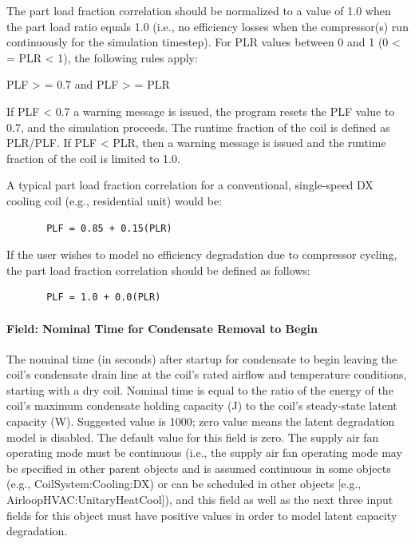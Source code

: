The part load fraction correlation should be normalized to a value of 1.0 when the part load ratio equals 1.0 (i.e., no efficiency losses when the compressor(s) run continuously for the simulation timestep). For PLR values between 0 and 1 (0 \textless{} = PLR \textless{} 1), the following rules apply:

PLF \textgreater{} = 0.7 and PLF \textgreater{} = PLR

If PLF \textless{} 0.7 a warning message is issued, the program resets the PLF value to 0.7, and the simulation proceeds. The runtime fraction of the coil is defined as PLR/PLF. If PLF \textless{} PLR, then a warning message is issued and the runtime fraction of the coil is limited to 1.0.

A typical part load fraction correlation for a conventional, single-speed DX cooling coil (e.g., residential unit) would be:

\begin{lstlisting}
       PLF = 0.85 + 0.15(PLR)
\end{lstlisting}

If the user wishes to model no efficiency degradation due to compressor cycling, the part load fraction correlation should be defined as follows:

\begin{lstlisting}
       PLF = 1.0 + 0.0(PLR)
\end{lstlisting}

\paragraph{Field: Nominal Time for Condensate Removal to Begin}\label{field-nominal-time-for-condensate-removal-to-begin}

The nominal time (in seconds) after startup for condensate to begin leaving the coil's condensate drain line at the coil's rated airflow and temperature conditions, starting with a dry coil. Nominal time is equal to the ratio of the energy of the coil's maximum condensate holding capacity (J) to the coil's steady-state latent capacity (W). Suggested value is 1000; zero value means the latent degradation model is disabled. The default value for this field is zero. The supply air fan operating mode must be continuous (i.e., the supply air fan operating mode may be specified in other parent objects and is assumed continuous in some objects (e.g., CoilSystem:Cooling:DX) or can be scheduled in other objects {[}e.g., AirloopHVAC:UnitaryHeatCool{]}), and this field as well as the next three input fields for this object must have positive values in order to model latent capacity degradation.

